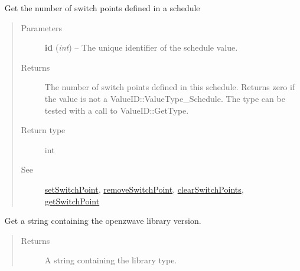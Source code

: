 \documentclass[letterpaper,10pt,english]{sphinxmanual}
\begin{document}
\begin{fulllineitems}
\begin{fulllineitems}
\begin{quote}
\begin{description}
\end{description}\end{quote}

\end{fulllineitems}


\begin{fulllineitems}
\label{libopenzwave:libopenzwave.PyManager.getNumSwitchPoints}~\label{libopenzwave:getnumswitchpoints}
Get the number of switch points defined in a schedule
\begin{quote}\begin{description}
\item[{Parameters}] \leavevmode
\textbf{id} (\emph{int}) -- The unique identifier of the schedule value.

\item[{Returns}] \leavevmode
The number of switch points defined in this schedule.  Returns zero if the value is not a ValueID::ValueType\_Schedule. The type can be tested with a call to ValueID::GetType.

\item[{Return type}] \leavevmode
int

\item[{See}] \leavevmode
{\hyperref[libopenzwave:setswitchpoint]{setSwitchPoint}}, {\hyperref[libopenzwave:removeswitchpoint]{removeSwitchPoint}}, {\hyperref[libopenzwave:clearswitchpoints]{clearSwitchPoints}}, {\hyperref[libopenzwave:getswitchpoint]{getSwitchPoint}}

\end{description}\end{quote}

\end{fulllineitems}


\begin{fulllineitems}
\label{libopenzwave:libopenzwave.PyManager.getOzwLibraryVersion}~\label{libopenzwave:getozwlibraryversion}
Get a string containing the openzwave library version.
\begin{quote}\begin{description}
\item[{Returns}] \leavevmode
A string containing the library type.


\end{description}
\end{quote}
\end{fulllineitems}
\end{fulllineitems}
\end{document}

